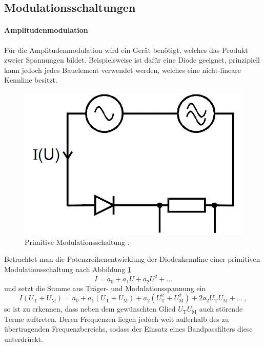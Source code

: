 \subsection{Modulationsschaltungen}
\label{subsec:debye}

\paragraph{Amplitudenmodulation}
Für die Amplitudenmodulation wird ein Gerät benötigt, welches das Produkt zweier Spannungen bildet.
Beispielsweise ist dafür eine Diode geeignet, prinzipiell kann jedoch jedes Bauelement verwendet werden, welches eine nicht-lineare Kennline besitzt.

\begin{figure}[!h]
    \centering
    \includegraphics[width = 14cm]{images/modulationsschaltung.png}
    \caption{Primitive Modulationsschaltung \cite{V59}.}
    \label{modulationsschaltung_einfach}
\end{figure}

Betrachtet man die Potenzreihenentwicklung der Diodenkennline einer primitiven Modulationsschaltung nach Abbildung \ref{modulationsschaltung_einfach}
\begin{equation*}
    I = a_0 + a_1 U + a_2 U^2 + \dots
\end{equation*}
und setzt die Summe aus Träger- und Modulationsspannung ein
\begin{equation*}
    I ( U_\text{T} + U_\text{M} ) = a_0 + a_1 ( U_\text{T} + U_\text{M} ) + a_2 ( U_\text{T}^2 + U_\text{M}^2 ) + 2 a_2 U_\text{T} U_\text{M} + \dots \,,
\end{equation*}
so ist zu erkennen, dass neben dem gewünschten Glied $U_\text{T} U_\text{M}$ auch störende Terme auftreten.
Deren Frequenzen liegen jedoch weit außerhalb des zu übertragenden Frequenzbereichs, sodass der Einsatz eines Bandpassfilters diese unterdrückt.

